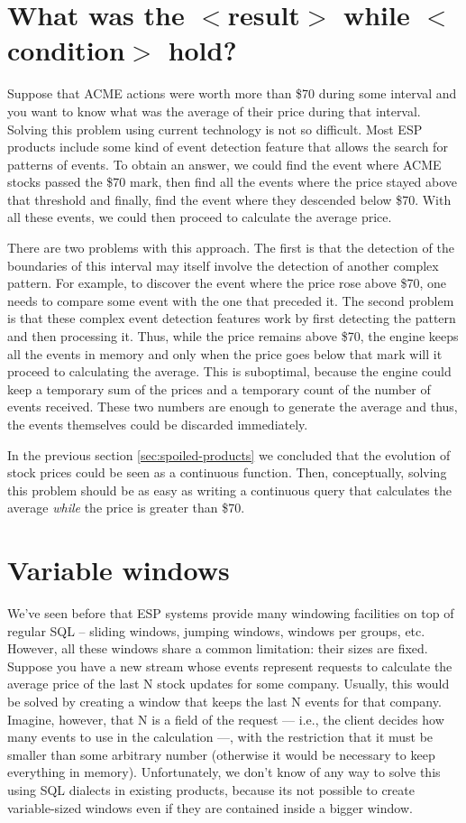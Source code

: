 \documentclass{report}
\begin{document}
\section{What was the $<$result$>$ while $<$condition$>$ hold?}
\label{sec:result-while}

Suppose that ACME actions were worth more than \$70 during some
interval and you want to know what was the average of their price
during that interval. Solving this problem using current technology is
not so difficult. Most ESP products include some kind of event
detection feature that allows the search for patterns of events. To
obtain an answer, we could find the event where ACME stocks passed the
\$70 mark, then find all the events where the price stayed above that
threshold and finally, find the event where they descended below
\$70. With all these events, we could then proceed to calculate the
average price.

There are two problems with this approach. The first is that the
detection of the boundaries of this interval may itself involve the
detection of another complex pattern. For example, to discover the
event where the price rose above \$70, one needs to compare some event
with the one that preceded it. The second problem is that these
complex event detection features work by first detecting the pattern
and then processing it. Thus, while the price remains above \$70, the
engine keeps all the events in memory and only when the price goes
below that mark will it proceed to calculating the average. This is
suboptimal, because the engine could keep a temporary sum of the
prices and a temporary count of the number of events received. These
two numbers are enough to generate the average and thus, the events
themselves could be discarded immediately.

In the previous section \ref{sec:spoiled-products} we concluded that
the evolution of stock prices could be seen as a continuous
function. Then, conceptually, solving this problem should be as easy
as writing a continuous query that calculates the average \emph{while}
the price is greater than \$70.


\section{Variable windows}

We've seen before that ESP systems provide many windowing facilities
on top of regular SQL -- sliding windows, jumping windows, windows per
groups, etc. However, all these windows share a common limitation:
their sizes are fixed. Suppose you have a new stream whose events
represent requests to calculate the average price of the last N stock
updates for some company. Usually, this would be solved by creating a
window that keeps the last N events for that company. Imagine,
however, that N is a field of the request --- i.e., the client decides
how many events to use in the calculation ---, with the restriction
that it must be smaller than some arbitrary number (otherwise it would
be necessary to keep everything in memory). Unfortunately, we don't
know of any way to solve this using SQL dialects in existing products,
because its not possible to create variable-sized windows even if they
are contained inside a bigger window.
\end{document}
